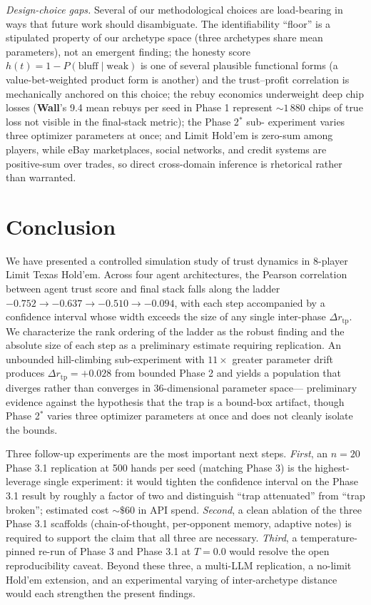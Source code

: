 \documentclass[10pt]{article} %
\newcommand{\arch}[1]{\textbf{#1}}
\newcommand{\rtp}{\ensuremath{r_{\mathrm{tp}}}}
\begin{document}
\textit{Design-choice gaps.} Several of our methodological
choices are load-bearing in ways that future work should
disambiguate. The identifiability ``floor'' is a stipulated
property of our archetype space (three archetypes share mean
parameters), not an emergent finding; the honesty score
$h(t) = 1 - P(\text{bluff}\mid\text{weak})$ is one of several
plausible functional forms (a value-bet-weighted product form is
another) and the trust--profit correlation is mechanically anchored
on this choice; the rebuy economics
underweight deep chip losses (\arch{Wall}'s 9.4 mean rebuys per
seed in Phase 1 represent ${\sim}1\,880$ chips of true loss not
visible in the final-stack metric); the Phase 2$^{*}$ sub-
experiment varies three optimizer parameters at once; and Limit
Hold'em is zero-sum among players, while eBay marketplaces,
social networks, and credit systems are positive-sum over trades,
so direct cross-domain inference is rhetorical rather than
warranted.

\section{Conclusion}

We have presented a controlled simulation study of trust dynamics
in 8-player Limit Texas Hold'em. Across four agent architectures,
the Pearson correlation between agent trust score and final stack
falls along the ladder $-0.752 \to -0.637 \to -0.510 \to -0.094$,
with each step accompanied by a confidence interval whose width
exceeds the size of any single inter-phase $\Delta\rtp$. We
characterize the rank ordering of the ladder as the robust finding
and the absolute size of each step as a preliminary estimate
requiring replication. An unbounded hill-climbing sub-experiment
with $11\times$ greater parameter drift produces $\Delta\rtp =
+0.028$ from bounded Phase 2 and yields a population that diverges
rather than converges in 36-dimensional parameter space---
preliminary evidence against the hypothesis that the trap is a
bound-box artifact, though Phase 2$^{*}$ varies three optimizer
parameters at once and does not cleanly isolate the bounds.

Three follow-up experiments are the most important next steps.
\textit{First}, an $n = 20$ Phase 3.1 replication at 500 hands per
seed (matching Phase 3) is the highest-leverage single experiment:
it would tighten the confidence interval on the Phase 3.1 result by
roughly a factor of two and distinguish ``trap attenuated'' from
``trap broken''; estimated cost ${\sim}\$60$ in API spend.
\textit{Second}, a clean ablation of the three Phase 3.1 scaffolds
(chain-of-thought, per-opponent memory, adaptive notes) is required
to support the claim that all three are necessary.
\textit{Third}, a temperature-pinned re-run of Phase 3 and Phase
3.1 at $T = 0.0$ would resolve the open reproducibility caveat.
Beyond these three, a multi-LLM replication, a no-limit Hold'em
extension, and an experimental varying of inter-archetype distance
would each strengthen the present findings.
\end{document}
